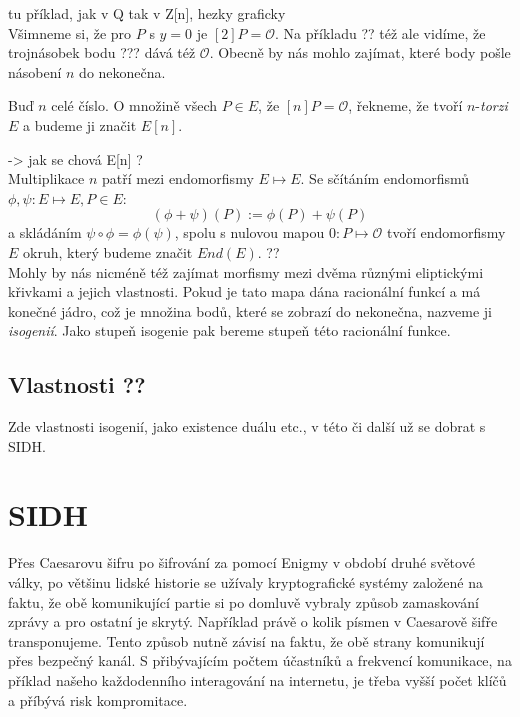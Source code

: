 \documentclass [12pt]{report}
\begin{document}
tu příklad, jak v Q tak v Z[n], hezky graficky\\


Všimneme si, že pro $P$ s $y=0$ je $[2]P = \mathcal{O}$. Na příkladu ?? též ale vidíme, že trojnásobek bodu ??? dává též $\mathcal{O}$. Obecně by nás mohlo zajímat, které body pošle násobení $n$ do nekonečna.
\begin{definice}
Buď $n$ celé číslo. O množině všech $P \in E$, že $[n] P = \mathcal{O}$, řekneme, že tvoří $n$-\textit{torzi} $E$ a budeme ji značit $E[n]$.
\end{definice}
-> jak se chová E[n] ? \\

Multiplikace $n$ patří mezi endomorfismy $E \mapsto E$. Se sčítáním endomorfismů $\phi,\psi : E \mapsto E, P \in E$:
\begin{equation*}
(\phi + \psi)(P) := \phi(P) + \psi(P)
\end{equation*}
a skládáním $\psi \circ \phi = \phi(\psi)$, spolu s nulovou mapou $0: P \mapsto \mathcal{O}$ tvoří endomorfismy $E$ okruh, který budeme značit $End(E)$. ??\\

Mohly by nás nicméně též zajímat morfismy mezi dvěma různými eliptickými křivkami a jejich vlastnosti. Pokud je tato mapa dána racionální funkcí a má konečné jádro, což je množina bodů, které se zobrazí do nekonečna, nazveme ji \textit{isogenií}. Jako stupeň isogenie pak bereme stupeň této racionální funkce.\\

\section{Vlastnosti ??}

Zde vlastnosti isogenií, jako existence duálu etc., v této či další už se dobrat s SIDH.



\chapter{SIDH}

Přes Caesarovu šifru po šifrování za pomocí Enigmy v období druhé světové války, po většinu lidské historie se užívaly kryptografické systémy založené na faktu, že obě komunikující partie si po domluvě vybraly způsob zamaskování zprávy a pro ostatní je skrytý. Například právě o kolik písmen v Caesarově šifře transponujeme. Tento způsob nutně závisí na faktu, že obě strany komunikují přes bezpečný kanál. S přibývajícím počtem účastníků a frekvencí komunikace, na příklad našeho každodenního interagování na internetu, je třeba vyšší počet klíčů a příbývá risk  kompromitace.\\
\end{document}

